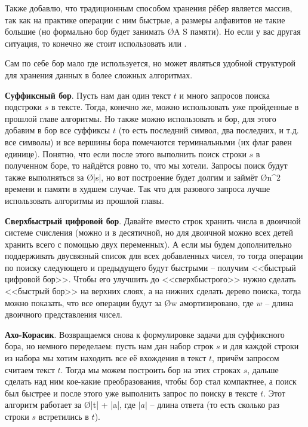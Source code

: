 Также добавлю, что традиционным способом хранения рёбер является массив, так как на практике операции с ним быстрые, а размеры алфавитов не такие большие (но формально бор будет занимать \O{A S} памяти). Но если у вас другая ситуация, то конечно же стоит использовать  или .


Сам по себе бор мало где используется, но может являться удобной структурой для хранения данных в более сложных алгоритмах.

\textbf{Суффиксный бор}. Пусть нам дан один текст $t$ и много запросов поиска подстроки $s$ в тексте. Тогда, конечно же, можно использовать уже пройденные в прошлой главе алгоритмы. Но также можно использовать и бор, для этого добавим в бор все суффиксы $t$ (то есть последний символ, два последних, и т.д. все символы) и все вершины бора помечаются терминальными (их флаг равен единице). Понятно, что если после этого выполнить поиск строки $s$ в полученном боре, то найдётся ровно то, что мы хотели. Запросы поиск будут также выполняться за \O{|s|}, но вот построение будет долгим и займёт \O{n^2} времени и памяти в худшем случае. Так что для разового запроса лучше использовать алгоритмы из прошлой главы.

\textbf{Сверхбыстрый цифровой бор}. Давайте вместо строк хранить числа в двоичной системе счисления (можно и в десятичной, но для двоичной можно всех детей хранить всего с помощью двух переменных). А если мы будем дополнительно поддерживать двусвязный список для всех добавленных чисел, то тогда операции по поиску следующего и предыдущего будут быстрыми -- получим <<быстрый цифровой бор>>. Чтобы его улучшить до <<сверхбыстрого>> нужно сделать <<быстрый бор>> на верхних слоях, а на нижних сделать дерево поиска, тогда можно показать, что все операции будут за \O{\log w} амортизировано, где $w$ -- длина двоичного представления чисел.

\textbf{Ахо-Корасик}. Возвращаемся снова к формулировке задачи для суффиксного бора, но немного переделаем: пусть нам дан набор строк $s$ и для каждой строки из набора мы хотим находить все её вхождения в текст $t$, причём запросом считаем текст $t$. Тогда мы можем построить бор на этих строках $s$, дальше сделать над ним кое-какие преобразования, чтобы бор стал компактнее, а поиск был быстрее и после этого уже выполнить запрос по поиску в тексте $t$. Этот алгоритм работает за \O{|t| + |a|}, где $|a|$ -- длина ответа (то есть сколько раз строки $s$ встретились в $t$).
